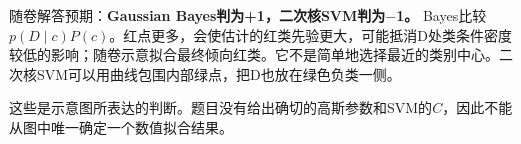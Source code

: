 随卷解答预期：\textbf{Gaussian Bayes判为+1，二次核SVM判为\ensuremath{-}1。} Bayes比较\(p(D\mid c)P(c)\)。红点更多，会使估计的红类先验更大，可能抵消D处类条件密度较低的影响；随卷示意拟合最终倾向红类。它不是简单地选择最近的类别中心。二次核SVM可以用曲线包围内部绿点，把D也放在绿色负类一侧。


这些是示意图所表达的判断。题目没有给出确切的高斯参数和SVM的\(C\)，因此不能从图中唯一确定一个数值拟合结果。
